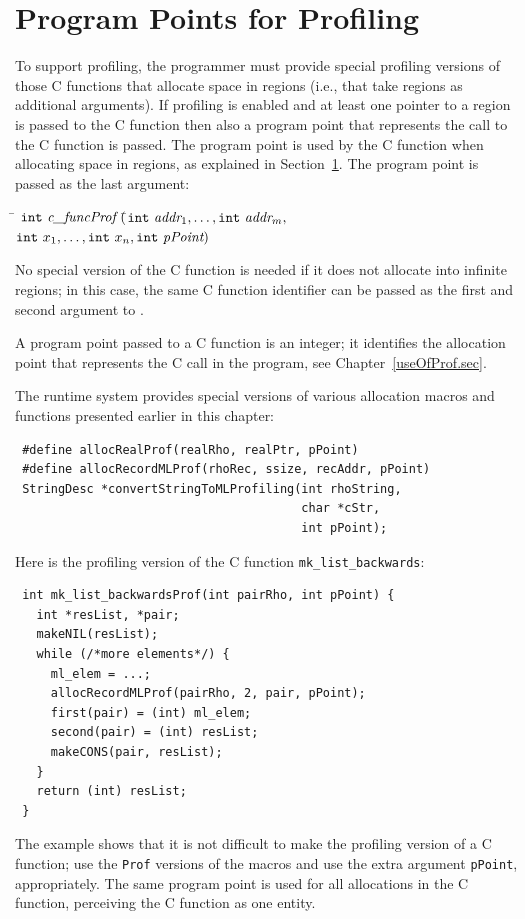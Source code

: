 \documentclass[12pt]{book}
\begin{document}
\section{Program Points for Profiling}
\label{prof.sec}
To support profiling, the programmer must provide special profiling
versions of those C functions that allocate space in regions (i.e.,
that take regions as additional arguments). If profiling is enabled
and at least one pointer to a region is passed to the C function then
also a program point that represents the call to the C function is
passed.  The program point is used by the C function when allocating
space in regions, as explained in Section~\ref{prof.sec}. The program
point is passed as the last argument:
\begin{tabbing}
\indent\=  $\texttt{int} \ \emph{c\_funcProf} \ ($\=$\texttt{int}\ \emph{addr}_1,
    \ldots, \texttt{int}\ \emph{addr}_m,$\\
  \>\>$ \texttt{int}\ x_1, \ldots,
    \texttt{int}\ x_n, \texttt{int}\ \emph{pPoint}) $
\end{tabbing}
\noindent
No special version of the C function is needed if it does not allocate
into infinite regions; in this case, the same C function identifier can be
passed as the first and second argument to .

A program point passed to a C function is an integer; it identifies the
allocation point that represents the C call in the program, see
Chapter~\ref{useOfProf.sec}.

The runtime system provides special versions of various allocation
macros and functions presented earlier in this chapter:
%
%
%
\begin{verbatim}
 #define allocRealProf(realRho, realPtr, pPoint)
 #define allocRecordMLProf(rhoRec, ssize, recAddr, pPoint)
 StringDesc *convertStringToMLProfiling(int rhoString, 
                                        char *cStr, 
                                        int pPoint);
\end{verbatim}

Here is the profiling version of the C function
\verb|mk_list_backwards|:
\begin{verbatim}
 int mk_list_backwardsProf(int pairRho, int pPoint) {
   int *resList, *pair;
   makeNIL(resList);  
   while (/*more elements*/) {
     ml_elem = ...;
     allocRecordMLProf(pairRho, 2, pair, pPoint);
     first(pair) = (int) ml_elem;
     second(pair) = (int) resList;
     makeCONS(pair, resList);
   }
   return (int) resList;
 }
\end{verbatim}
The example shows that it is not difficult to make the profiling
version of a C function; use the \texttt{Prof} versions of the
macros and use the extra argument \texttt{pPoint}, appropriately. The
same program point is used for all allocations in the C function,
perceiving the C function as one entity.
\end{document}
